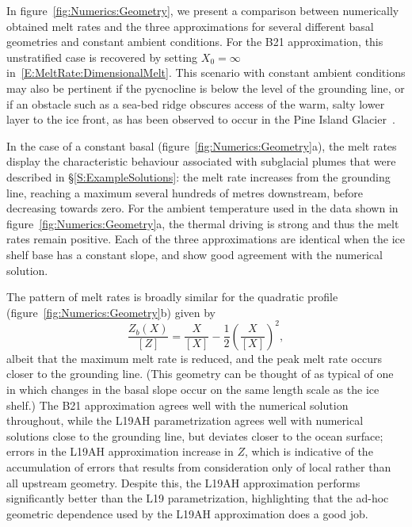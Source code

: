 \documentclass[openacc]{rsproca_new}%
\begin{document}
In figure~\ref{fig:Numerics:Geometry}, we present a comparison between numerically obtained melt rates and the three approximations for several different basal geometries and constant ambient conditions. For the B21 approximation, this unstratified case is recovered by setting $X_0 = \infty$ in~\eqref{E:MeltRate:DimensionalMelt}. This scenario with constant ambient conditions may also be pertinent if the pycnocline is below the level of the grounding line, or if an obstacle such as a sea-bed ridge obscures access of the warm, salty lower layer to the ice front, as has been observed to occur in the Pine Island Glacier~\citep{DeRydt2014JGeophysResOceans, Bradley2021}. 

In the case of a constant basal (figure~\ref{fig:Numerics:Geometry}a), the melt rates display the characteristic behaviour associated with subglacial plumes that were described in \S\ref{S:ExampleSolutions}: the melt rate increases from the grounding line, reaching a maximum several hundreds of metres downstream, before decreasing towards zero. For the ambient temperature used in the data shown in figure~\ref{fig:Numerics:Geometry}a, the thermal driving is strong and thus the melt rates remain positive. Each of the three approximations are identical when the ice shelf base has a constant slope, and show good agreement with the numerical solution.

The pattern of melt rates is broadly similar for the quadratic profile (figure~\ref{fig:Numerics:Geometry}b) given by
\begin{equation}\label{E:Numerics:QuadraticGeometry}
\frac{Z_b(X)}{\left[Z\right]}= \frac{X}{\left[X\right]} - \frac{1}{2}\left(\frac{X}{\left[X\right]}\right)^2,
\end{equation}
albeit that the maximum melt rate is reduced, and the peak melt rate occurs closer to the grounding line. (This geometry can be thought of as typical of one in which changes in the basal slope occur on the same length scale as the ice shelf.) The B21 approximation agrees well with the numerical solution throughout, while the L19AH parametrization agrees well with numerical solutions close to the grounding line, but deviates closer to the ocean surface; errors in the L19AH approximation increase in $Z$, which is indicative of the accumulation of errors that results from consideration only of local rather than all upstream geometry. Despite this, the L19AH approximation performs significantly better than the L19 parametrization, highlighting that the ad-hoc geometric dependence used by the L19AH approximation does a good job. 
\end{document}
